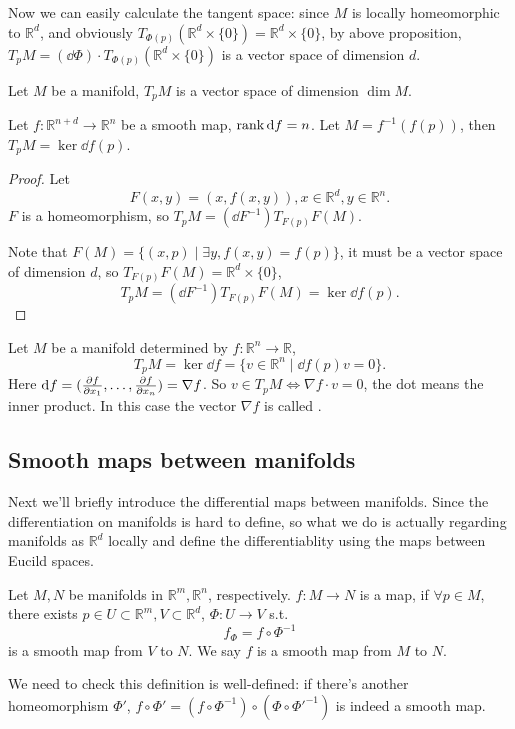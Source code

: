 Now we can easily calculate the tangent space:
since $M$ is locally homeomorphic to $\mathbb{R}^{d}$, and obviously
$T_{\Phi(p)}(\mathbb{R}^{d}\times \{0\}) = \mathbb{R}^{d} \times \{0\}$,
by above proposition,
$T_p M = (\dd \Phi)\cdot T_{\Phi(p)}(\mathbb{R}^{d} \times \{0\})$ is
a vector space of dimension $d$.

\begin{theorem}
    Let $M$ be a manifold, $T_p M$ is a vector space of dimension $\dim M$.
\end{theorem}
\begin{proposition}
	Let $f: \mathbb{R}^{n+d}\to \mathbb{R}^{n}$ be a smooth map,
	$\operatorname{rank} \mathop{}\!\mathrm{d} f = n$. Let $M = f^{-1}(f(p))$, then $T_pM = \ker \dd f(p)$.
\end{proposition}
\begin{proof}[Proof]
    Let
	\[
		F(x, y) = (x, f(x, y)), x\in \mathbb{R}^{d}, y\in \mathbb{R}^{n}.
	\]
	$F$ is a homeomorphism, so $T_pM = (\dd F^{-1}) T_{F(p)}F(M)$.

	Note that $F(M) = \{(x, p)\mid \exists y, f(x, y) = f(p)\}$, it must
	be a vector space of dimension $d$,
	so $T_{F(p)} F(M) = \mathbb{R}^{d}\times \{0\}$,
	\[
	T_p M = (\dd F^{-1}) T_{F(p)}F(M) = \ker \dd f(p).
	\]
\end{proof}
\begin{example}
    Let $M$ be a manifold determined by $f: \mathbb{R}^{n}\to \mathbb{R}$,
	\[
	T_p M = \ker \dd f = \{v\in \mathbb{R}^{n}\mid \dd f(p) v = 0\}.
	\]
	Here $\mathop{}\!\mathrm{d} f = (\frac{\partial f}{\partial x_1}, \dots, \frac{\partial f}{\partial x_n}) = \nabla f$.
	So $v\in T_p M \iff \nabla f \cdot v = 0$, the dot means the inner product.
	In this case the vector $\nabla f$ is called .
\end{example}

\subsection{Smooth maps between manifolds}
\label{sub:Smooth maps between manifolds}
Next we'll briefly introduce the differential maps between manifolds.
Since the differentiation on manifolds is hard to define, so what we
do is actually regarding manifolds as $\mathbb{R}^{d}$ locally and
define the differentiablity using the maps between Eucild spaces.
\begin{definition}
	Let $M, N$ be manifolds in $\mathbb{R}^{m}, \mathbb{R}^{n}$, respectively.
	$f: M\to N$ is a map, if $\forall p\in M$,
	there exists $p\in U \subset \mathbb{R}^m,
	V \subset \mathbb{R}^d$, $\Phi: U\to V$ s.t.
	\[
	f_\Phi = f\circ \Phi^{-1}
	\]
	is a smooth map from $V$ to $N$.
	We say $f$ is a smooth map from $M$ to $N$.
\end{definition}
We need to check this definition is well-defined:
if there's another homeomorphism $\Phi'$,
$f \circ \Phi' = (f\circ \Phi^{-1})\circ(\Phi \circ \Phi'^{-1})$ is indeed
a smooth map.

